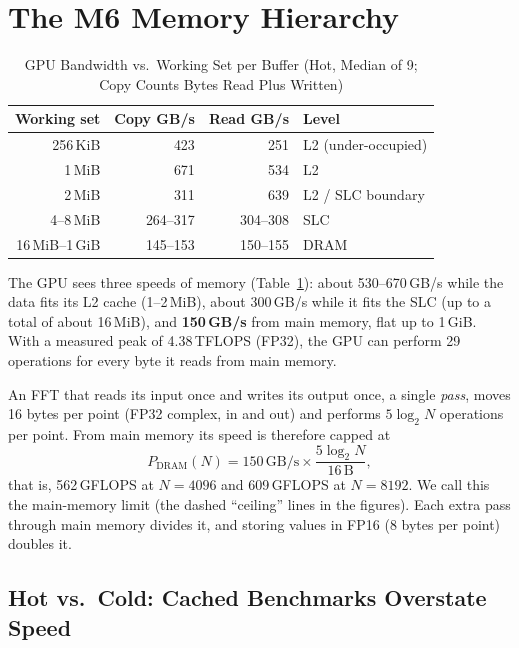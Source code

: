 \documentclass[conference]{IEEEtran}
\newcommand{\GF}{\,GFLOPS}
\begin{document}
\section{The M6 Memory Hierarchy}\label{sec:hier}

\begin{table}[t]
\centering
\caption{GPU Bandwidth vs.\ Working Set per Buffer (Hot, Median of 9; Copy Counts Bytes Read Plus
Written)}
\label{tab:bw}
\footnotesize
\begin{tabular}{@{}rrrl@{}}
\toprule
\textbf{Working set} & \textbf{Copy GB/s} & \textbf{Read GB/s} & \textbf{Level} \\
\midrule
256\,KiB & 423 & 251 & L2 (under-occupied) \\
1\,MiB & 671 & 534 & L2 \\
2\,MiB & 311 & 639 & L2 / SLC boundary \\
4--8\,MiB & 264--317 & 304--308 & SLC \\
16\,MiB--1\,GiB & 145--153 & 150--155 & DRAM \\
\bottomrule
\end{tabular}
\end{table}

The GPU sees three speeds of memory (Table~\ref{tab:bw}): about 530--670\,GB/s while the data fits its
L2 cache (1--2\,MiB), about 300\,GB/s while it fits the SLC (up to a total of about 16\,MiB), and
\textbf{150\,GB/s} from main memory, flat up to 1\,GiB. With a measured peak of 4.38\,TFLOPS (FP32),
the GPU can perform 29 operations for every byte it reads from main memory.

An FFT that reads its input once and writes its output once, a single \emph{pass}, moves 16 bytes per
point (FP32 complex, in and out) and performs $5\log_2N$ operations per point. From main memory its
speed is therefore capped at
\begin{equation}
  P_\text{DRAM}(N) = 150\,\text{GB/s}\times\frac{5\log_2 N}{16\,\text{B}},
  \label{eq:ceiling}
\end{equation}
that is, 562\GF{} at $N=4096$ and 609\GF{} at $N=8192$. We call this the main-memory limit (the
dashed ``ceiling'' lines in the figures). Each extra pass through main memory divides it, and storing
values in FP16 (8 bytes per point) doubles it.

\subsection{Hot vs.\ Cold: Cached Benchmarks Overstate Speed}\label{sec:hotcold}
\end{document}
